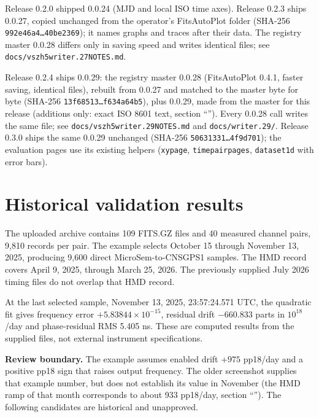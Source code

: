 \documentclass[11pt,a4paper]{article}
\renewcommand{\_}{\usscore\allowbreak}
\newcommand{\warning}[1]{\par\noindent\colorbox{light}{\parbox{\dimexpr\linewidth-2\fboxsep}{\textbf{Review boundary.} #1}}\par}
\begin{document}
Release 0.2.0 shipped 0.0.24 (MJD and local ISO time axes). Release 0.2.3 ships 0.0.27, copied
unchanged from the operator's FitsAutoPlot folder (SHA-256 \texttt{992e46a4\ldots40be2369}); it names
graphs and traces after their data. The registry master 0.0.28 differs only in saving speed and writes
identical files; see \texttt{docs/vszh5\_writer\_0.0.27\_NOTES.md}.

Release 0.2.4 ships 0.0.29: the registry master 0.0.28 (FitsAutoPlot 0.4.1, faster saving, identical
files), rebuilt from 0.0.27 and matched to the master byte for byte (SHA-256
\texttt{13f68513\ldots f634a64b5}), plus 0.0.29, made from the master for this release (additions
only: exact ISO 8601 text, section ``''). Every 0.0.28 call writes the same file;
see \texttt{docs/vszh5\_writer\_0.0.29\_NOTES.md} and \texttt{docs/writer\_0.0.29/}. Release 0.3.0 ships the
same 0.0.29 unchanged (SHA-256 \texttt{50631331\ldots 4f9d701}); the evaluation pages use its existing
helpers (\texttt{xy\_page}, \texttt{time\_pair\_pages}, \texttt{dataset\_1d} with error bars).
\clearpage

\section{Historical validation results}\label{sec:historical}
The uploaded archive contains 109 FITS.GZ files and 40 measured channel pairs,
9,810 records per pair. The example selects October 15 through November 13,
2025, producing 9,600 direct MicroSem-to-CNS\_GPS1 samples. The HMD record covers
April 9, 2025, through March 25, 2026. The previously supplied July 2026 timing
files do not overlap that HMD record.

At the last selected sample, November 13, 2025, 23:57:24.571 UTC, the quadratic
fit gives frequency error \(+5.83844\times10^{-15}\), residual drift
\(-660.833\) parts in \(10^{18}\)/day and phase-residual RMS 5.405 ns.
These are computed results from the supplied files, not external instrument
specifications.

\warning{The example assumes enabled drift \(+975\) pp18/day and a positive
pp18 sign that raises output frequency. The older screenshot supplies that
example number, but does not establish its value in November (the HMD ramp of that month corresponds
to about 933 pp18/day, section ``\nameref{sec:evalresults}''). The following candidates are historical
and unapproved.}
\end{document}
